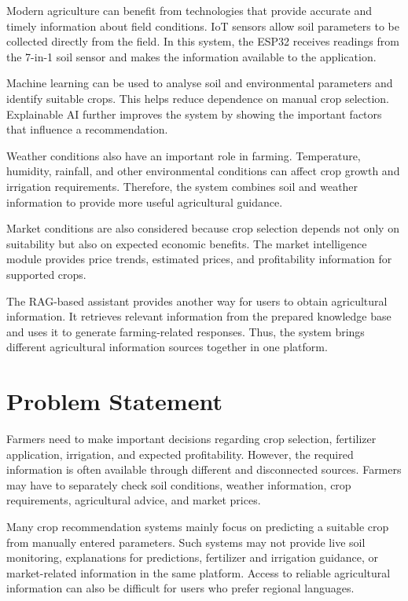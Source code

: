 Modern agriculture can benefit from technologies that provide accurate and timely information about field conditions. IoT sensors allow soil parameters to be collected directly from the field. In this system, the ESP32 receives readings from the 7-in-1 soil sensor and makes the information available to the application.

Machine learning can be used to analyse soil and environmental parameters and identify suitable crops. This helps reduce dependence on manual crop selection. Explainable AI further improves the system by showing the important factors that influence a recommendation.

Weather conditions also have an important role in farming. Temperature, humidity, rainfall, and other environmental conditions can affect crop growth and irrigation requirements. Therefore, the system combines soil and weather information to provide more useful agricultural guidance.

Market conditions are also considered because crop selection depends not only on suitability but also on expected economic benefits. The market intelligence module provides price trends, estimated prices, and profitability information for supported crops.

The RAG-based assistant provides another way for users to obtain agricultural information. It retrieves relevant information from the prepared knowledge base and uses it to generate farming-related responses. Thus, the system brings different agricultural information sources together in one platform.

\section{Problem Statement}

Farmers need to make important decisions regarding crop selection, fertilizer application, irrigation, and expected profitability. However, the required information is often available through different and disconnected sources. Farmers may have to separately check soil conditions, weather information, crop requirements, agricultural advice, and market prices.

Many crop recommendation systems mainly focus on predicting a suitable crop from manually entered parameters. Such systems may not provide live soil monitoring, explanations for predictions, fertilizer and irrigation guidance, or market-related information in the same platform. Access to reliable agricultural information can also be difficult for users who prefer regional languages.


